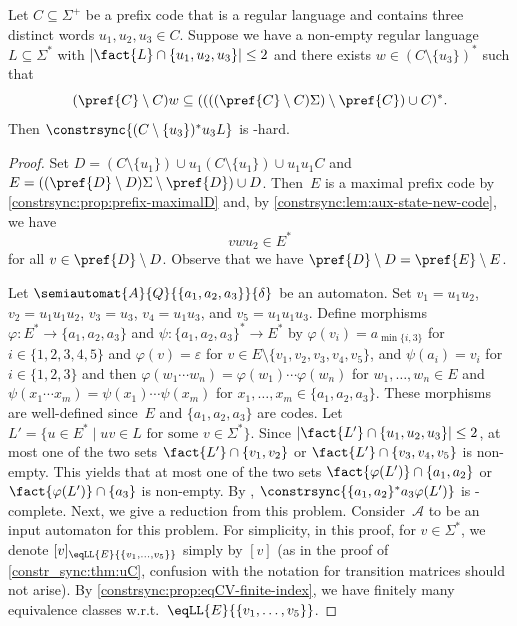 \begin{theorem} \label{constr_sync:thm:Cu}
	Let $C \subseteq \Sigma^+$ be a 
	prefix code	that is a regular language
	and contains three distinct words $u_1, u_2, u_3 \in C$.
	Suppose we have a non-empty regular language $L \subseteq \Sigma^*$
	with $|\fact{L} \cap \{u_1, u_2, u_3\}| \le 2$
	and there exists $w \in (C \setminus \{u_3\} )^*$
	such that
	\[
	( \pref{C}\setminus C )w \subseteq ( ( ( ( \pref{C}\setminus C)\Sigma) \setminus \pref{C} ) \cup C )^*.
	\]
	Then $\constrsync{(C \setminus \{u_3\})^* u_3 L}$
	is \PSPACE-hard.
\end{theorem}
\begin{proof}
	Set $D = ( C \setminus \{u_1\} ) \cup u_1 ( C \setminus \{u_1\} ) \cup u_1 u_1 C$
	and $E = ( ( \pref{D} \setminus D )\Sigma \setminus \pref{D} ) \cup D$.
	Then~$E$ is a maximal prefix code by \cref{constrsync:prop:prefix-maximalD}
	and, by \cref{constrsync:lem:aux-state-new-code}, we have
	\begin{equation}\label{constrsync:eqn:reset-pspace-reduction}
		v w u_2 \in E^*
	\end{equation}
	for all $v \in \pref{D} \setminus D$.
	Observe that we have $\pref{D} \setminus D = \pref{E} \setminus E$.	
	
	Let $\semiautomat{A}{Q}{\{a_1, a_2, a_3\}}{\delta}$
	be an automaton.
	Set $v_1 = u_1 u_2$, $v_2 = u_1 u_1 u_2$, $v_3 = u_3$, $v_4 = u_1 u_3$, 
	and $v_5 = u_1 u_1 u_3$.
	Define morphisms $\varphi \colon E^* \to \{a_1, a_2, a_3\}$
	and $\psi \colon \{a_1, a_2, a_3\}^* \to E^*$
	by $\varphi(v_i) = a_{\min\{i,3\}}$ for $i \in \{1,2,3,4,5\}$
	and	$\varphi(v) = \varepsilon$ for $v \in E \setminus \{v_1, v_2, v_3, v_4, v_5\}$,
	and $\psi(a_i) = v_i$ for $i \in \{1,2,3\}$
	and then $\varphi(w_1 \cdots w_n) = \varphi(w_1) \cdots \varphi(w_n)$
	for $w_1,\ldots, w_n \in E$
	and $\psi(x_1 \cdots x_m) = \psi(x_1) \cdots \psi(x_m)$
	for $x_1, \ldots, x_m \in \{a_1, a_2, a_3\}$.
	These morphisms are well-defined since~$E$ and $\{a_1,a_2,a_3\}$ are codes.	
	Let $L' = \{ u \in E^* \mid uv \in L \text{ for some $v \in \Sigma^*$} \}$.
	Since $|\fact{L'} \cap \{u_1, u_2, u_3\}| \le 2$,
	at most one of the two sets
	$\fact{L'} \cap \{v_1, v_2\}$
	or
	$\fact{L'} \cap \{v_3, v_4, v_5\}$ is non-empty.
	This yields
	that at most one of the two sets
	$\fact{\varphi(L')} \cap \{a_1, a_2\}$
	or
	$\fact{\varphi(L')} \cap \{a_3\}$
	is non-empty.
	By ,
	$\constrsync{\{a_1, a_2\}^*a_3 \varphi(L')}$ is \PSPACE-complete.	
	Next, we give a reduction from this problem. Consider~$\mathcal A$
	to be an input automaton for this problem.
	For simplicity, in this proof, for $v \in \Sigma^*$,
	we denote $[v]_{\eqLL{E}{\{v_1, \ldots, v_5\}}}$
	simply by $[v]$ (as in the proof of \cref{constr_sync:thm:uC}, confusion
	with the notation for transition matrices should not arise).
	By \cref{constrsync:prop:eqCV-finite-index},
	we have finitely many equivalence classes w.r.t.~$\eqLL{E}{\{v_1, \ldots, v_5\}}$.
		

\end{proof}
